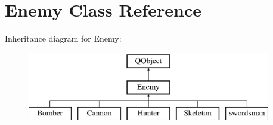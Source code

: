 \hypertarget{class_enemy}{\section{Enemy Class Reference}
\label{class_enemy}
}
Inheritance diagram for Enemy\-:\begin{figure}[H]
\begin{center}
\leavevmode
\includegraphics[height=3.000000cm]{class_enemy}
\end{center}
\end{figure}
